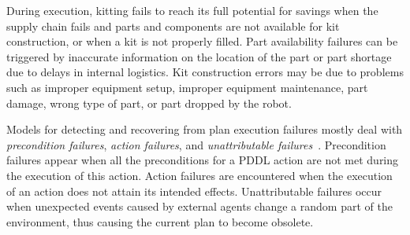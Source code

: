 During execution, kitting fails to reach its full potential for savings when the supply chain fails and parts and components are not available for kit construction, or when a kit is not properly filled. Part availability failures can be triggered by inaccurate information on the location of the part or part shortage due to delays in internal logistics. Kit construction errors may be due to problems such as improper equipment setup, improper equipment maintenance, part damage, wrong type of part, or part dropped by the robot.


Models for detecting and recovering from plan execution failures mostly deal with \textit{precondition failures}, \textit{action failures}, and \textit{unattributable failures}~\cite{Myers1998}. Precondition failures appear when all the preconditions for a PDDL action are not met during the execution of this action. Action failures are encountered when the execution of an action does not attain its intended effects. Unattributable failures occur when unexpected events caused by external agents change a random part of the environment, thus causing the current plan to become obsolete. 

